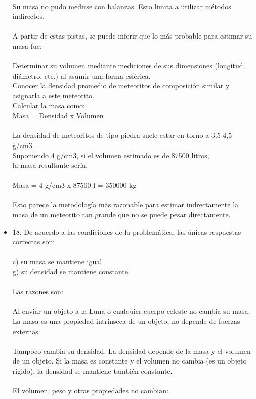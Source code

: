 \documentclass{article}
\begin{document}
\begin{itemize}
\\
Su masa no pudo medirse con balanzas. Esto limita a utilizar métodos indirectos.\\
\\
A partir de estas pistas, se puede inferir que lo más probable para estimar su masa fue:\\
\\
Determinar su volumen mediante mediciones de sus dimensiones (longitud, diámetro, etc.) al asumir una forma esférica.\\
Conocer la densidad promedio de meteoritos de composición similar y asignarla a este meteorito.\\
Calcular la masa como:\\
Masa = Densidad x Volumen\\
\\
La densidad de meteoritos de tipo piedra suele estar en torno a 3,5-4,5 g/cm3.\\
Suponiendo 4 g/cm3, si el volumen estimado es de 87500 litros,\\
la masa resultante sería:\\
\\
Masa = 4 g/cm3 x 87500 l = 350000 kg\\
\\
Esto parece la metodología más razonable para estimar indrectamente la masa de un meteorito tan grande que no se puede pesar directamente.\\
\item{18.}
De acuerdo a las condiciones de la problemática, las únicas respuestas correctas son:\\
\\
c) su masa se mantiene igual\\
g) su densidad se mantiene constante.\\
\\
Las razones son:\\
\\
Al enviar un objeto a la Luna o cualquier cuerpo celeste no cambia su masa. La masa es una propiedad intrínseca de un objeto, no depende de fuerzas externas.\\
\\
Tampoco cambia su densidad. La densidad depende de la masa y el volumen de un objeto. Si la masa es constante y el volumen no cambia (es un objeto rígido), la densidad se mantiene también constante.\\
\\
El volumen, peso y otras propiedades no cambian:\\

\end{itemize}
\end{document}
